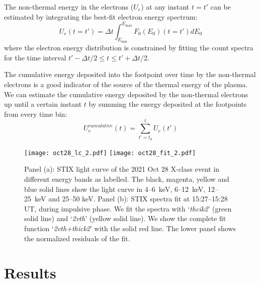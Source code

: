 The non-thermal energy in the electrons (\( U_{e} \)) at any instant \( t = t' \) can be estimated by integrating the best-fit electron energy spectrum:
\[
U_{e}(t=t') = \Delta t \int_{E_{\text{min}}}^{E_{\text{max}}} F_{0}(E_{0})(t=t') dE_{0}
\]
where the electron energy distribution is constrained by fitting the count spectra for the time interval \( t' - \Delta t/2 \leq t \leq t' + \Delta t/2 \).

The cumulative energy deposited into the footpoint over time by the non-thermal electrons is a good indicator of the source of the thermal energy of the plasma. We can estimate the cumulative energy deposited by the non-thermal electrons up until a certain instant \( t \) by summing the energy deposited at the footpoints from every time bin:
\[
U^{cumulative}_{e}(t) = \sum_{t'=t_{0}}^{t} U_{e}(t')
\]

\begin{figure*}[ht!]
    \centering
    \texttt{[image: oct28\_lc\_2.pdf]} 
    \texttt{[image: oct28\_fit\_2.pdf]}
    \caption{Panel (a): STIX light curve of the 2021 Oct 28 X-class event in different energy bands as labelled. The black, magenta, yellow and blue solid lines show the light curve in 4{--}6~keV, 6{--}12~keV, 12{--}25~keV and 25{--}50 keV. Panel (b): STIX spectra fit at 15:27{--}15:28 UT, during impulsive phase. We fit the spectra with `\textit{thcik2}' (green solid line) and `\textit{2vth}' (yellow solid line). We show the complete fit function `\textit{2vth+thick2}' with the solid red line. The lower panel shows the normalized residuals of the fit.}
    \label{fig:stix_an}
    \end{figure*}

\section{Results}\label{res}

